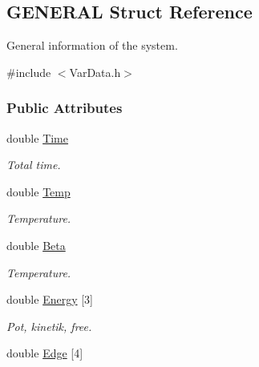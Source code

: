 \hypertarget{structGENERAL}{\subsection{\-G\-E\-N\-E\-R\-A\-L \-Struct \-Reference}
\label{structGENERAL}
}


\-General information of the system.  




{\ttfamily \#include $<$\-Var\-Data.\-h$>$}

\subsubsection*{\-Public \-Attributes}
\begin{DoxyCompactItemize}
\item 
\hypertarget{structGENERAL_af51ff88ae9c6c4b9907f516c09ebf68f}{double \hyperlink{structGENERAL_af51ff88ae9c6c4b9907f516c09ebf68f}{\-Time}}\label{structGENERAL_af51ff88ae9c6c4b9907f516c09ebf68f}

\begin{DoxyCompactList}\small\item\em \-Total time. \end{DoxyCompactList}\item 
\hypertarget{structGENERAL_a30b2ceb495b99ab029b438563e5f22fa}{double \hyperlink{structGENERAL_a30b2ceb495b99ab029b438563e5f22fa}{\-Temp}}\label{structGENERAL_a30b2ceb495b99ab029b438563e5f22fa}

\begin{DoxyCompactList}\small\item\em \-Temperature. \end{DoxyCompactList}\item 
\hypertarget{structGENERAL_aded0b530ca9ce830881a607b109e709f}{double \hyperlink{structGENERAL_aded0b530ca9ce830881a607b109e709f}{\-Beta}}\label{structGENERAL_aded0b530ca9ce830881a607b109e709f}

\begin{DoxyCompactList}\small\item\em \-Temperature. \end{DoxyCompactList}\item 
\hypertarget{structGENERAL_ae35f6a776d95c5f300f4c70e2fc9bb48}{double \hyperlink{structGENERAL_ae35f6a776d95c5f300f4c70e2fc9bb48}{\-Energy} \mbox{[}3\mbox{]}}\label{structGENERAL_ae35f6a776d95c5f300f4c70e2fc9bb48}

\begin{DoxyCompactList}\small\item\em \-Pot, kinetik, free. \end{DoxyCompactList}\item 
\hypertarget{structGENERAL_a507c812f21f55c46378bfc7c30d0bc75}{double \hyperlink{structGENERAL_a507c812f21f55c46378bfc7c30d0bc75}{\-Edge} \mbox{[}4\mbox{]}}\label{structGENERAL_a507c812f21f55c46378bfc7c30d0bc75}


\end{DoxyCompactItemize}
